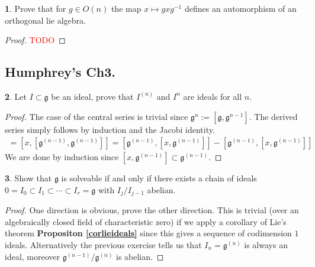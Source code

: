 \documentclass[10.5pt]{article}
\theoremstyle{definition}
\newtheorem{pb}{}
\numberwithin{example}{subsection}
\numberwithin{proposition}{subsection}
\numberwithin{pb}{subsection}
\begin{document}
        \begin{pb}
            Prove that for \(g \in O(n)\) the map \(x \mapsto gxg^{-1}\) defines an automorphism of an orthogonal lie algebra.

            \begin{proof}
                \textcolor{red}{TODO}
            \end{proof}
        \end{pb}


        \subsection{Humphrey's Ch3.}

        \begin{pb}
            Let \(I \subset \mathfrak{g}\) be an ideal, prove that \(I^{(n)}\) and \(I^n\) are ideals for all \(n\).

            \begin{proof}
                The case of the central series is trivial since \(\mathfrak{g}^{n} := [\mathfrak{g},\mathfrak{g}^{n-1}]\). The derived series simply follows by induction and the Jacobi identity.
                \begin{align}
                    [x,\mathfrak{g}^{(n)}] = [x,[\mathfrak{g}^{(n-1)},\mathfrak{g}^{(n-1)}]] = [\mathfrak{g}^{(n-1)},[x,\mathfrak{g}^{(n-1)}]] - [\mathfrak{g}^{(n-1)},[x,\mathfrak{g}^{(n-1)}]]
                \end{align}
                We are done by induction since \([x,\mathfrak{g}^{(n-1)}] \subset \mathfrak{g}^{(n-1)}\).
            \end{proof}
        \end{pb}

        \begin{pb}
            Show that \(\mathfrak{g}\) is solveable if and only if there exists a chain of ideals \(0 = I_0 \subset I_1 \subset \cdots \subset I_r = \mathfrak{g}\) with \(I_j/I_{j-1}\) abelian.

            \begin{proof}
                One direction is obvious, prove the other direction. This is trivial (over an algebraically closed field of characteristic zero) if we apply a corollary of Lie's theorem \textbf{Propositon \ref{corlieideals}} since this gives a sequence of codimension \(1\) ideals. Alternatively the previous exercise tells us that \(I_n = \mathfrak{g}^{(n)}\) is always an ideal, moreover \(\mathfrak{g}^{(n-1)}/\mathfrak{g}^{(n)}\) is abelian.
            \end{proof}
        \end{pb}
\end{document}
